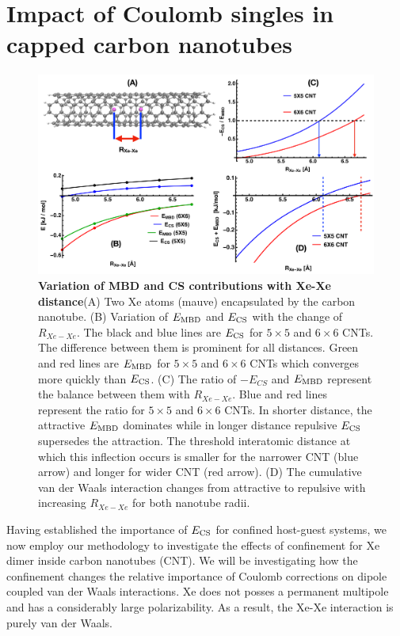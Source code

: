\documentclass[aps,prl,groupaddress, twocolumn]{revtex4-1}
\begin{document}
\section*{Impact of Coulomb singles in capped carbon nanotubes}
\begin{figure}[hbtp]
\includegraphics[scale=0.5, width=\textwidth]{Plots/CNTplots.pdf}
\caption{\textbf{Variation of MBD and CS contributions with Xe-Xe distance}(A) Two Xe atoms (mauve) encapsulated by the carbon nanotube. (B) Variation of $E_{\rm MBD}$ and $E_{\rm CS}$ with the change of $R_{Xe-Xe}$. The black and blue lines are $E_{\rm CS}$ for $5 \times 5$ and $6 \times 6$ CNTs. The difference between them is prominent for all distances. Green and red lines are $E_{\rm MBD}$ for $5 \times 5$ and $6 \times 6$ CNTs which converges more quickly than $E_{\rm CS}$. (C) The ratio of $-E_{CS}$ and $E_{\rm MBD}$ represent the balance between them with $R_{Xe-Xe}$. Blue and red lines represent the ratio for $5\times5$ and $6\times6$ CNTs. In shorter distance, the attractive $E_{\rm MBD}$ dominates while in longer distance repulsive $E_{\rm CS}$ supersedes the attraction. The threshold interatomic distance at which this inflection occurs is smaller for the narrower CNT (blue arrow) and longer for wider CNT (red arrow). (D) The cumulative van der Waals interaction changes from attractive to repulsive with increasing $R_{Xe-Xe}$ for both nanotube radii.}\label{fig:CNT}
\end{figure}
Having established the importance of $E_{\rm CS}$ for confined host-guest systems, we now employ our methodology to investigate the effects of confinement for Xe dimer inside carbon nanotubes (CNT). We will be investigating how the confinement changes the relative importance of Coulomb corrections on dipole coupled van der Waals interactions. Xe does not posses a permanent multipole and has a considerably large polarizability. As a result, the Xe-Xe interaction is purely van der Waals. 
\end{document}
